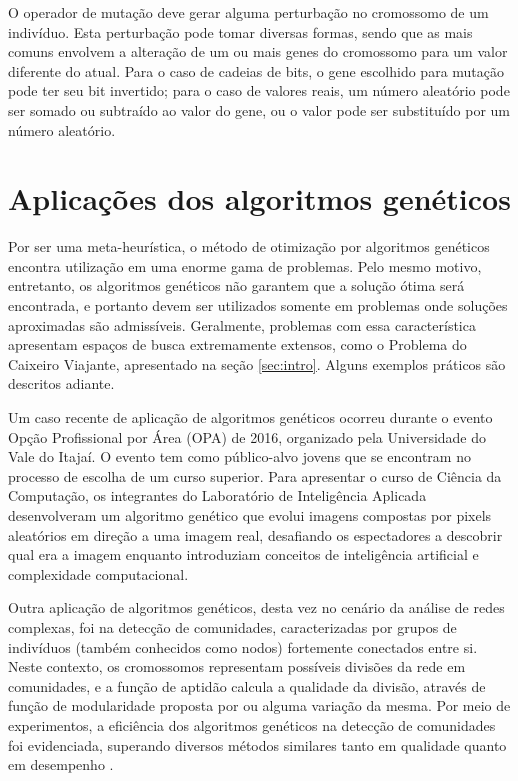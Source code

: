 \documentclass[12pt]{article}
\begin{document}
O operador de mutação deve gerar alguma perturbação no cromossomo de um indivíduo. Esta perturbação pode tomar diversas formas, sendo que as mais comuns envolvem a alteração de um ou mais genes do cromossomo para um valor diferente do atual. Para o caso de cadeias de bits, o gene escolhido para mutação pode ter seu bit invertido; para o caso de valores reais, um número aleatório pode ser somado ou subtraído ao valor do gene, ou o valor pode ser substituído por um número aleatório.

\section{Aplicações dos algoritmos genéticos} \label{sec:applications}

Por ser uma meta-heurística, o método de otimização por algoritmos genéticos encontra utilização em uma enorme gama de problemas. Pelo mesmo motivo, entretanto, os algoritmos genéticos não garantem que a solução ótima será encontrada, e portanto devem ser utilizados somente em problemas onde soluções aproximadas são admissíveis. Geralmente, problemas com essa característica apresentam espaços de busca extremamente extensos, como o Problema do Caixeiro Viajante, apresentado na seção \ref{sec:intro}. Alguns exemplos práticos são descritos adiante.

Um caso recente de aplicação de algoritmos genéticos ocorreu durante o evento Opção Profissional por Área (OPA) de 2016, organizado pela Universidade do Vale do Itajaí. O evento tem como público-alvo jovens que se encontram no processo de escolha de um curso superior. Para apresentar o curso de Ciência da Computação, os integrantes do Laboratório de Inteligência Aplicada desenvolveram um algoritmo genético que evolui imagens compostas por pixels aleatórios em direção a uma imagem real, desafiando os espectadores a descobrir qual era a imagem enquanto introduziam conceitos de inteligência artificial e complexidade computacional.

Outra aplicação de algoritmos genéticos, desta vez no cenário da análise de redes complexas, foi na detecção de comunidades, caracterizadas por grupos de indivíduos (também conhecidos como nodos) fortemente conectados entre si. Neste contexto, os cromossomos representam possíveis divisões da rede em comunidades, e a função de aptidão calcula a qualidade da divisão, através de função de modularidade proposta por \cite{Newman2004} ou alguma variação da mesma. Por meio de experimentos, a eficiência dos algoritmos genéticos na detecção de comunidades foi evidenciada, superando diversos métodos similares tanto em qualidade quanto em desempenho \cite{Tasgin2007,Pizzuti2008}.
\end{document}
